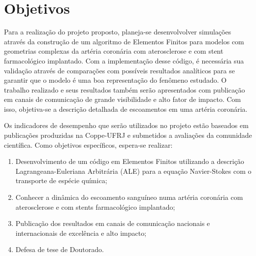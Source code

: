 \section{Objetivos}

Para a realização do projeto proposto, planeja-se desenvolvolver simulações através da construção de um algoritmo de Elementos Finitos para modelos com geometrias complexas da artéria coronária com aterosclerose e com stent farmacológico implantado. 
Com a implementação desse código, é necessária sua validação através de comparações com possíveis resultados analíticos para se garantir que o modelo é uma boa representação do fenômeno estudado. 
O trabalho realizado e seus resultados também serão apresentados com publicação em canais de comunicação de grande visibilidade e alto fator de impacto. 
Com isso, objetiva-se a descrição detalhada de escoamentos em uma artéria coronária.

\bigskip
Os indicadores de desempenho que serão utilizados no projeto estão baseados em publicações produzidas na Coppe-UFRJ e 
submetidos a avaliações da comunidade científica. 
Como objetivos específicos, espera-se realizar:

\begin{enumerate}
\item Desenvolvimento de um código em Elementos Finitos utilizando a descrição Lagrangeana-Euleriana Arbitrária (ALE) para a equação Navier-Stokes
com o transporte de espécie química;

\item Conhecer a dinâmica do escoamento sanguíneo numa artéria coronária com aterosclerose
e com stents farmacológico implantado;

\item Publicação dos resultados em canais de comunicação nacionais e internacionais de excelência e alto impacto;

\item Defesa de tese de Doutorado.

\end{enumerate}

